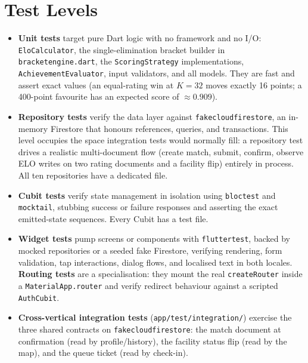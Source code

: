 \documentclass{configurations/polimi3i_thesis}
\renewcommand{\_}{\textunderscore\allowbreak}
\begin{document}
\section{Test Levels}
\begin{itemize}
    \item \textbf{Unit tests} target pure Dart logic with no framework and no I/O: \texttt{EloCalculator}, the single-elimination bracket builder in \texttt{bracket\_engine.dart}, the \texttt{ScoringStrategy} implementations, \texttt{AchievementEvaluator}, input validators, and all models. They are fast and assert exact values (an equal-rating win at $K=32$ moves exactly 16 points; a 400-point favourite has an expected score of $\approx 0.909$).
    \item \textbf{Repository tests} verify the data layer against \texttt{fake\_cloud\_firestore}, an in-memory Firestore that honours references, queries, and transactions. This level occupies the space integration tests would normally fill: a repository test drives a realistic multi-document flow (create match, submit, confirm, observe ELO writes on two rating documents and a facility flip) entirely in process. All ten repositories have a dedicated file.
    \item \textbf{Cubit tests} verify state management in isolation using \texttt{bloc\_test} and \texttt{mocktail}, stubbing success or failure responses and asserting the exact emitted-state sequences. Every Cubit has a test file.
    \item \textbf{Widget tests} pump screens or components with \texttt{flutter\_test}, backed by mocked repositories or a seeded fake Firestore, verifying rendering, form validation, tap interactions, dialog flows, and localised text in both locales. \textbf{Routing tests} are a specialisation: they mount the real \texttt{createRouter} inside a \texttt{MaterialApp.router} and verify redirect behaviour against a scripted \texttt{AuthCubit}.
    \item \textbf{Cross-vertical integration tests} (\texttt{app/test/integration/}) exercise the three shared contracts on \texttt{fake\_cloud\_firestore}: the match document at confirmation (read by profile/history), the facility status flip (read by the map), and the queue ticket (read by check-in).
\end{itemize}
\end{document}

